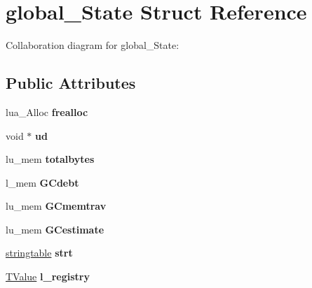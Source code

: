 \hypertarget{structglobal___state}{\section{global\+\_\+\+State Struct Reference}
\label{structglobal___state}
}


Collaboration diagram for global\+\_\+\+State\+:
\subsection*{Public Attributes}
\begin{DoxyCompactItemize}
\item 
\hypertarget{structglobal___state_aa26cfe7f3761fda56740a545d15001ea}{lua\+\_\+\+Alloc {\bfseries frealloc}}\label{structglobal___state_aa26cfe7f3761fda56740a545d15001ea}

\item 
\hypertarget{structglobal___state_af12419c778ac134ece8e269bfcaf06ad}{void $\ast$ {\bfseries ud}}\label{structglobal___state_af12419c778ac134ece8e269bfcaf06ad}

\item 
\hypertarget{structglobal___state_a8c2db9bdf2b63884b770acbbc8f0d25c}{lu\+\_\+mem {\bfseries totalbytes}}\label{structglobal___state_a8c2db9bdf2b63884b770acbbc8f0d25c}

\item 
\hypertarget{structglobal___state_a238d1f76279f013961d01abb93a74a47}{l\+\_\+mem {\bfseries G\+Cdebt}}\label{structglobal___state_a238d1f76279f013961d01abb93a74a47}

\item 
\hypertarget{structglobal___state_a772d53fa9c456c43ed8196948214f07e}{lu\+\_\+mem {\bfseries G\+Cmemtrav}}\label{structglobal___state_a772d53fa9c456c43ed8196948214f07e}

\item 
\hypertarget{structglobal___state_ae23429c806265058502b09625ba3249f}{lu\+\_\+mem {\bfseries G\+Cestimate}}\label{structglobal___state_ae23429c806265058502b09625ba3249f}

\item 
\hypertarget{structglobal___state_a8cdea736db8d268e488aa9e9fa5c992c}{\hyperlink{structstringtable}{stringtable} {\bfseries strt}}\label{structglobal___state_a8cdea736db8d268e488aa9e9fa5c992c}

\item 
\hypertarget{structglobal___state_a3e4eaa91bd14094bf3217073aa40b4f7}{\hyperlink{structlua___t_value}{T\+Value} {\bfseries l\+\_\+registry}}\label{structglobal___state_a3e4eaa91bd14094bf3217073aa40b4f7}


\end{DoxyCompactItemize}
